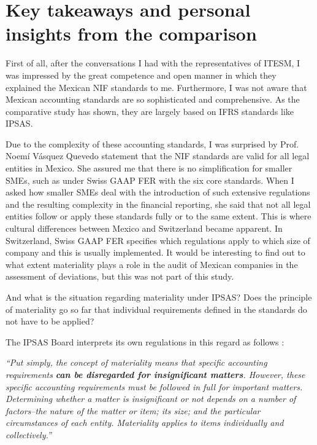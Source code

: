 \documentclass[10pt]{article}
\begin{document}
\newpage
\section{Key takeaways and personal insights from the comparison}\label{sec:key_takeaways_and_personal_insights_from_the_comparison}
First of all, after the conversations I had with the representatives of ITESM, I was impressed by the great competence and open manner in which they explained the Mexican NIF standards to me. Furthermore, I was not aware that Mexican accounting standards are so sophisticated and comprehensive. As the comparative study has shown, they are largely based on IFRS standards like IPSAS.

Due to the complexity of these accounting standards, I was surprised by Prof. Noemí Vásquez Quevedo statement that the NIF standards are valid for all legal entities in Mexico. She assured me that there is no simplification for smaller SMEs, such as under Swiss GAAP FER with the six core standards. When I asked how smaller SMEs deal with the introduction of such extensive regulations and the resulting complexity in the financial reporting, she said that not all legal entities follow or apply these standards fully or to the same extent. This is where cultural differences between Mexico and Switzerland became apparent. In Switzerland, Swiss GAAP FER specifies which regulations apply to which size of company and this is usually implemented. It would be interesting to find out to what extent materiality plays a role in the audit of Mexican companies in the assessment of deviations, but this was not part of this study.

And what is the situation regarding materiality under IPSAS? Does the principle of materiality go so far that individual requirements defined in the standards do not have to be applied?

The IPSAS Board interprets its own regulations in this regard as follows \cite[p.~1]{Materiality}:

\textit{“{}Put simply, the concept of materiality means that specific accounting requirements }\textit{\textbf{can be disregarded for insignificant matters}}\textit{. However, these specific accounting requirements must be followed in full for important matters. Determining whether a matter is insignificant or not depends on a number of factors--the nature of the matter or item; its size; and the particular circumstances of each entity. Materiality applies to items individually and collectively.”{}}
\end{document}
